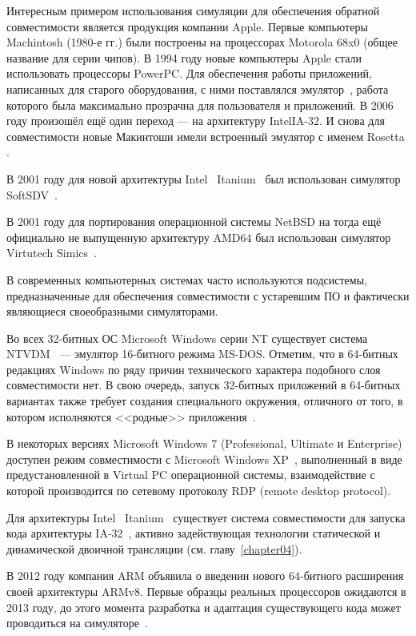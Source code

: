 \begin{itemize*}

\item Интересным примером использования симуляции для обеспечения обратной совместимости является продукция компании Apple.  Первые компьютеры Machintosh (1980-е гг.) были построены на процессорах Motorola 68x0 (общее название для серии чипов). В 1994 году новые компьютеры Apple стали использовать процессоры PowerPC. Для обеспечения работы приложений, написанных для старого оборудования, с ними поставлялся эмулятор~\cite{apple-ppcsoftware}, работа которого была максимально прозрачна для пользователя и приложений. В 2006 году произошёл ещё один переход --- на архитектуру Intel\textregistered IA-32. И снова для совместимости новые Макинтоши имели встроенный эмулятор с именем Rosetta \cite{apple-rosetta, macosx-internals}.

\item В 2001 году для новой архитектуры Intel\textregistered~ Itanium\texttrademark~ был использован симулятор SoftSDV~\cite{softsdv-ia64}.

\item В 2001 году для портирования операционной системы NetBSD на тогда ещё официально не выпущенную архитектуру AMD64 был использован симулятор Virtutech Simics~\cite{netbsd-amd64}.

\item В современных компьютерных системах часто используются подсистемы, предназначенные для обеспечения совместимости с устаревшим ПО и фактически являющиеся своеобразными симуляторами.

\item Во всех 32-битных ОС Microsoft Windows серии NT существует система NTVDM~\cite{ntvdm} --- эмулятор 16-битного режима MS-DOS. Отметим, что в 64-битных редакциях Windows по ряду причин технического характера подобного слоя совместимости нет. В свою очередь, запуск 32-битных приложений в 64-битных вариантах также требует создания специального окружения, отличного от того, в котором исполняются <<родные>> приложения~\cite[глава 3]{wininternals6-pt1}.

\item В некоторых версиях Microsoft Windows 7 (Professional, Ultimate и Enterprise) доступен режим совместимости с Microsoft Windows XP~\cite{winxp-mode}, выполненный в виде предустановленной в Virtual PC операционной системы, взаимодействие с которой производится по сетевому протоколу RDP (\abbr remote desktop protocol).

\item Для архитектуры Intel\textregistered~ Itanium\texttrademark~ существует система совместимости для запуска кода архитектуры IA-32~\cite{Baraz03ia-32execution}, активно задействующая технологии статической и динамической двоичной трансляции (см. главу~\ref{chapter04}).

\item В 2012 году компания ARM объявила о введении нового 64-битного расширения своей архитектуры ARMv8. Первые образцы реальных процессоров ожидаются в 2013 году, до этого момента разработка и адаптация существующего кода может проводиться на симуляторе~\cite{armv8}.
\end{itemize*}

